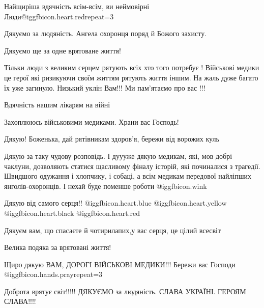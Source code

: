  
 
 
 
 
\zzSecCmt

\begin{itemize} %
Найщиріша вдячність всім-всім, ви неймовірні Люди@igg{fbicon.heart.red}{repeat=3}

Дякуємо за людяність. Ангела охоронця поряд й Божого захисту.

Дякуємо ще за одне врятоване життя!


Тільки люди з великим серцем рятують всіх хто того потребує ! Військові медики
це герої які ризикуючи своїм життям рятують життя іншим. На жаль дуже багато їх
уже загинуло. Низький уклін Вам!!! Ми пам'ятаємо про вас !!!

Вдячність нашим лікарям на війні

Захоплююсь військовими медиками. Храни вас Господь!

Дякую! Боженька, дай рятівникам здоров'я, бережи від ворожих куль


Дякую за таку чудову розповідь. І дуууже дякую медикам, які, мов добрі чаклуни,
дозволяють статися щасливому фіналу історій, які починалися з трагедії.
Швидшого одужання і хлопчику, і собаці, а всім медикам передової найліпших
янголів-охоронців. І нехай буде поменше роботи @igg{fbicon.wink} 

Дякую від самого серця!! @igg{fbicon.heart.blue}  @igg{fbicon.heart.yellow}  @igg{fbicon.heart.black} @igg{fbicon.heart.red}

Дякуєм вам, що спасаєте й чотирилапих,у вас серця, це цілий всесвіт

Велика подяка за врятовані життя!

Щиро дякую ВАМ, ДОРОГІ ВІЙСЬКОВІ МЕДИКИ!!! Бережи вас Господи @igg{fbicon.hands.pray}{repeat=3} 

Доброта врятує світ!!!!! ДЯКУЄМО за людяність. СЛАВА УКРАЇНІ. ГЕРОЯМ СЛАВА!!!!


\end{itemize}
